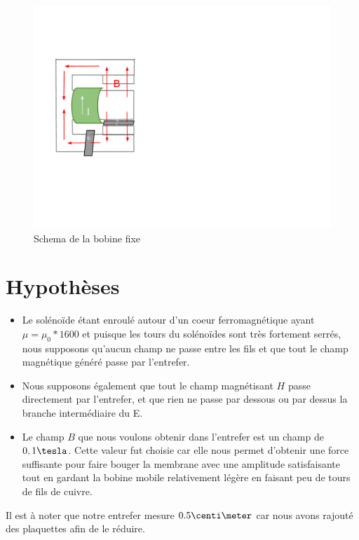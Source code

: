 \begin{figure}	
\begin{center}
\includegraphics[scale=0.5]{img/schema-aimant-bobine}
\end{center}
\caption{Schema de la bobine fixe}		
\label{fig:bobinefixe}		
\end{figure}

\section{Hypothèses}
\begin{itemize}
\item Le solénoïde étant enroulé autour d'un coeur ferromagnétique ayant $\mu = \mu_0 * 1600$ et puisque les 
tours du solénoïdes sont très fortement serrés, nous supposons qu'aucun champ ne passe entre les fils et que tout le champ magnétique généré passe par l'entrefer.
\item Nous supposons également que tout le champ magnétisant $H$ passe directement par l'entrefer, et que rien ne passe par dessous ou par dessus la branche intermédiaire du E.
\item Le champ $B$ que nous voulons obtenir dans l'entrefer est un champ de $0,1\tesla$. Cette valeur fut choisie car elle nous permet d'obtenir une force suffisante pour faire bouger la membrane avec une amplitude satisfaisante tout en gardant la bobine 
mobile relativement légère en faisant peu de tours de fils de cuivre.
\end{itemize}
Il est à noter que notre entrefer mesure $0.5\centi\meter$ car nous avons rajouté des plaquettes afin de le réduire.

